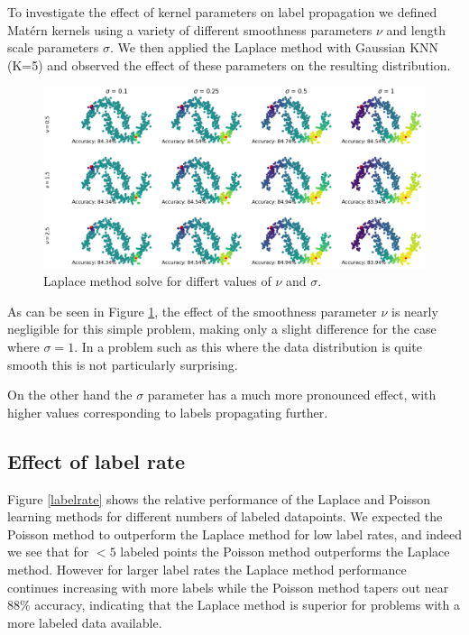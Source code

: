 \documentclass[11pt]{amsart}
\begin{document}
To investigate the effect of kernel parameters on label propagation we defined Matérn kernels using a variety of different smoothness parameters $\nu$ and length scale parameters $\sigma$. We then applied the Laplace method with Gaussian KNN (K=5) and observed the effect of these parameters on the resulting distribution.

\begin{figure}[h]
    \includegraphics[width=15cm]{Figs/laplace_cv.png}
    \caption{Laplace method solve for differt values of $\nu$ and $\sigma$.}
    \label{laplace_cv}
\end{figure}

As can be seen in Figure \ref{laplace_cv}, the effect of the smoothness parameter $\nu$ is nearly negligible for this simple problem, making only a slight difference for the case where $\sigma=1$. In a problem such as this where the data distribution is quite smooth this is not particularly surprising. 

On the other hand the $\sigma$ parameter has a much more pronounced effect, with higher values corresponding to labels propagating further. 

\subsection{Effect of label rate}

Figure \ref{labelrate} shows the relative performance of the Laplace and Poisson learning methods for different numbers of labeled datapoints. We expected the Poisson method to outperform the Laplace method for low label rates, and indeed we see that for $<5$ labeled points the Poisson method outperforms the Laplace method. However for larger label rates the Laplace method performance continues increasing with more labels while the Poisson method tapers out near 88\% accuracy, indicating that the Laplace method is superior for problems with a more labeled data available. 
\end{document}
